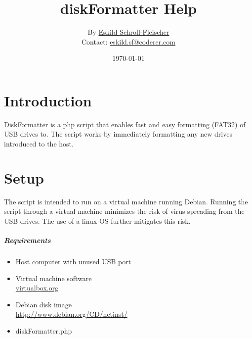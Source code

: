 \documentclass{article}
\begin{document}
\vspace{-5cm}
\author{By \href{mailto:eskild.sf@coderer.com}{Eskild Schroll-Fleischer}\\
Contact: \href{mailto:eskild.sf@coderer.com}{eskild.sf@coderer.com}}
\date{\today}
\title{diskFormatter Help}
\maketitle

\section{Introduction}
DiskFormatter is a php script that enables fast and easy formatting (FAT32) of USB drives to.
The script works by immediately formatting any new drives introduced to the host.

\section{Setup}
The script is intended to run on a virtual machine running Debian. Running the script through a virtual machine minimizes the risk of virus spreading from the USB drives. The use of a linux OS further mitigates this risk.

\subparagraph{Requirements}
\begin{itemize}
\item Host computer with unused USB port
\item Virtual machine software \\ \url{virtualbox.org}
\item Debian disk image \\ \url{http://www.debian.org/CD/netinst/}
\item diskFormatter.php
\end{itemize}
\end{document}
